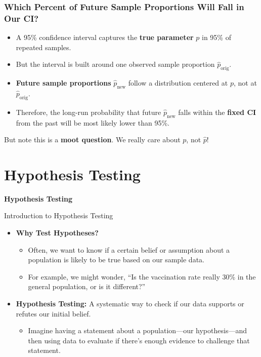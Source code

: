 \documentclass[handout]{beamer} %
\newcommand{\transitionslide}[1]{
    \begin{frame}[plain]
        \centering
        \vspace{1cm}
        \Huge
        \textcolor{moonstoneblue!150}{\textbf{#1}}
    \end{frame}
}
\begin{document}
\begin{frame}
\frametitle{Which Percent of Future Sample Proportions Will Fall in Our CI?}
\begin{itemize}
    \item A 95\% confidence interval captures the \textbf{true parameter} \( p \) in 95\% of repeated samples.
    \item But the interval is built around one observed sample proportion \( \hat{p}_{\text{orig}} \).
    \item \textbf{Future sample proportions} \( \hat{p}_{\text{new}} \) follow a distribution centered at \( p \), not at \( \hat{p}_{\text{orig}} \).
    \item Therefore, the long-run probability that future \( \hat{p}_{\text{new}} \) falls within the \textbf{fixed CI} from the past will be most likely lower than 95\%.
\end{itemize}
But note this is a \textbf{moot question}. We really care about $p$, not $\hat{p}$!
\end{frame}


\section{Hypothesis Testing}
\transitionslide{Hypothesis Testing}

\begin{frame}{Introduction to Hypothesis Testing}
    \begin{itemize}
        \item \textbf{Why Test Hypotheses?}
        \begin{itemize}
            \item Often, we want to know if a certain belief or assumption about a population is likely to be true based on our sample data.
            \item For example, we might wonder, “Is the vaccination rate really 30\% in the general population, or is it different?”
        \end{itemize}
        
        \item \textbf{Hypothesis Testing:} A systematic way to check if our data supports or refutes our initial belief.
        \begin{itemize}
            \item Imagine having a statement about a population—our hypothesis—and then using data to evaluate if there’s enough evidence to challenge that statement.
        \end{itemize}
    \end{itemize}
\end{frame}
\end{document}
